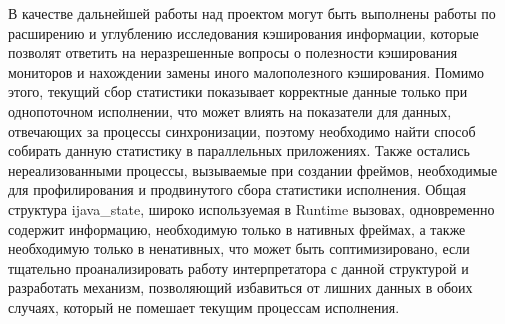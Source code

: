 В качестве дальнейшей работы над проектом могут быть выполнены работы по расширению и углублению исследования кэширования информации, которые позволят ответить на неразрешенные вопросы о полезности кэширования мониторов и нахождении замены иного малополезного кэширования. Помимо этого, текущий сбор статистики показывает корректные данные только при однопоточном исполнении, что может влиять на показатели для данных, отвечающих за процессы синхронизации, поэтому необходимо найти способ собирать данную статистику в параллельных приложениях. Также остались нереализованными процессы, вызываемые при создании фреймов, необходимые для профилирования и продвинутого сбора статистики исполнения. Общая структура ijava\_state, широко используемая в Runtime вызовах, одновременно содержит информацию, необходимую только в нативных фреймах, а также необходимую только в ненативных, что может быть соптимизировано, если тщательно проанализировать работу интерпретатора с данной структурой и разработать механизм, позволяющий избавиться от лишних данных в обоих случаях, который не помешает текущим процессам исполнения.